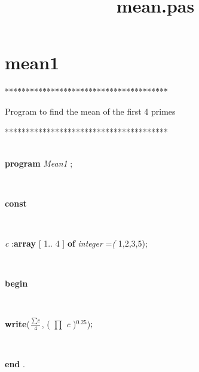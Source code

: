 \documentclass[10pt, a4paper]{article}
\title{mean.pas}
\begin{document}
\maketitle

\tableofcontents
\section{mean1}
\begin{tabbing}
***\=***\=***\=***\=***\=***\=***\=***\=***\=***\=***\=***\=***\=\kill
\\
\end{tabbing}
\textrm{Program to find the mean of the first 4 primes} 
\begin{tabbing}
***\=***\=***\=***\=***\=***\=***\=***\=***\=***\=***\=***\=***\=\kill
\\
\\
\parbox{14cm}{\textsf{\textbf{program}  \textit{Mean1} ;}}\\
\+\parbox{14cm}{\textsf{\textbf{const} }}\\
\parbox{14cm}{\textsf{\textit{c} :\textbf{array} [ 1.. 4 ] \textbf{of}  \textit{integer} =\textit{(} 1,2,3,5);}}\\
\-\<\+\parbox{14cm}{\textsf{\textbf{begin} }}\\
\parbox{14cm}{\textsf{\textbf{write}($\frac{ \sum  \textit{c}}{4}$, ( $\prod$  \textit{c} )$^{0.25}$)}; }\\
\<\-\parbox{14cm}{\textsf{\textbf{end} .}}\\
\\
\\
\\
\end{tabbing}
\end{document}
